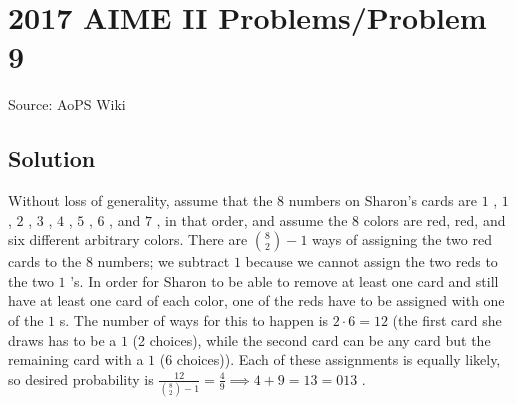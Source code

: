 \documentclass[12pt]{article}
\begin{document}
\section*{{2017 AIME II Problems/Problem 9}}
Source: AoPS Wiki

\subsection*{Solution}
Without loss of generality, assume that the $8$ numbers on Sharon's cards are $1$ , $1$ , $2$ , $3$ , $4$ , $5$ , $6$ , and $7$ , in that order, and assume the $8$ colors are red, red, and six different arbitrary colors. There are ${8\choose2}-1$ ways of assigning the two red cards to the $8$ numbers; we subtract $1$ because we cannot assign the two reds to the two $1$ 's.
In order for Sharon to be able to remove at least one card and still have at least one card of each color, one of the reds have to be assigned with one of the $1$ s. The number of ways for this to happen is $2 \cdot 6 = 12$ (the first card she draws has to be a $1$ (2 choices), while the second card can be any card but the remaining card with a $1$ (6 choices)). Each of these assignments is equally likely, so desired probability is $\frac{12}{{8\choose2}-1}=\frac{4}{9} \implies 4 + 9 = 13 = \boxed{013}$ .
\end{document}
